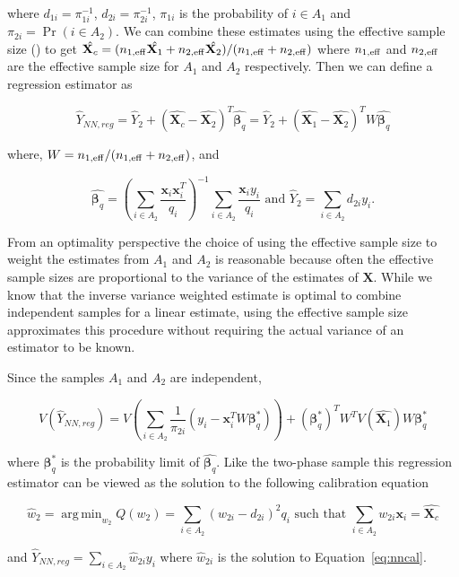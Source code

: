 \documentclass[12pt]{article}
\DeclareMathOperator*{\argmin}{arg\,min}
\renewcommand{\bf}[1]{\mathbf{#1}}
\begin{document}
where $d_{1i} = \pi_{1i}^{-1}$, $d_{2i} = \pi_{2i}^{-1}$, $\pi_{1i}$ is the
probability of $i \in A_1$ and $\pi_{2i} = \Pr(i \in A_2)$. 
We can combine these estimates using the effective sample size 
(\cite{kish1965survey}) to get
$\hat{\bf X_c} = (n_{1, \rm{eff}} \hat{\bf X_1} + n_{2, \rm{eff}}\hat{\bf X_2}) / 
(n_{1, \rm{eff}} + n_{2, \rm{eff}})$ where $n_{1, \rm{eff}}$ and 
$n_{2, \rm{eff}}$ are the effective sample size for $A_1$ and $A_2$ respectively.
Then we can define a regression estimator as

$$
\hat Y_{NN, reg} = \hat Y_2 + (\hat{\bf X_c} - \hat{\bf X_2})^T \hat{\bm \beta_q} = 
\hat Y_2 + (\hat{\bf X_1} - \hat{\bf X_2})^T W\hat{\bm \beta_q}
$$

where, $W = n_{1, \rm{eff}} / (n_{1, \rm{eff}} + n_{2, \rm{eff}})$, and

$$
\hat{\bm \beta_q} = 
\left(\sum_{i \in A_2} \frac{\bf x_i \bf x_i^T}{q_i}\right)^{-1} 
\sum_{i \in A_2} \frac{\bf x_i y_i}{q_i} \text{ and }
\hat Y_2 = \sum_{i \in A_2} d_{2i} y_i.
$$

From an optimality perspective the choice of using the effective sample size to
weight the estimates from $A_1$ and $A_2$ is reasonable because often the
effective sample sizes are proportional to the variance of the estimates 
of $\bf X$. While we know that the inverse variance weighted estimate is optimal
to combine independent samples for a linear estimate, using the effective sample
size approximates this procedure without requiring the actual variance of an
estimator to be known.

Since the samples $A_1$ and $A_2$ are independent, 

$$
V(\hat Y_{NN, reg}) = 
V\left(\sum_{i \in A_2} \frac{1}{\pi_{2i}}(y_i - \bf x_i^TW\bm \beta^*_q)\right)
+ (\bm \beta^*_q)^T W^T V(\hat{\bf X_1}) W \bm \beta_q^*
$$

where $\bm \beta_q^*$ is the probability limit of $\hat{\bm \beta_q}$. Like the
two-phase sample this regression estimator can be viewed as the solution to the
following calibration equation 

\begin{equation}\label{eq:nncal}
  \hat w_2 = \argmin_{w_2} Q(w_2) = \sum_{i \in A_2} (w_{2i} - d_{2i})^2 q_i 
  \text{ such that } \sum_{i \in A_2} w_{2i} \bf x_i = \hat{\bf X_c}
\end{equation}

and $\hat Y_{NN, reg} = \sum_{i \in A_2} \hat w_{2i} y_i$ where $\hat
w_{2i}$ is the solution to Equation~\ref{eq:nncal}.
\end{document}
